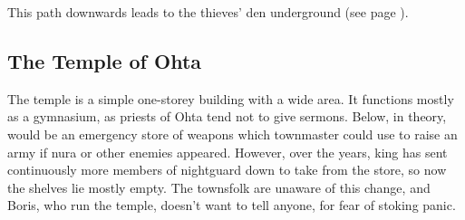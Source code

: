\begin{multicols}{2}

This path downwards leads to the thieves' den underground (see page \pageref{pigexit}).

\subsection{The Temple of Ohta}

The temple is a simple one-storey building with a wide area.
It functions mostly as a gymnasium, as priests of Ohta tend not to give sermons.
Below, in theory, would be an emergency store of weapons which \gls{townmaster} could use to raise an army if nura or other enemies appeared.
However, over the years, \gls{king} has sent continuously more members of \gls{nightguard} down to take from the store, so now the shelves lie mostly empty.
The townsfolk are unaware of this change, and Boris, who run the temple, doesn't want to tell anyone, for fear of stoking panic.


\end{multicols}


\setcounter{list}{0}

